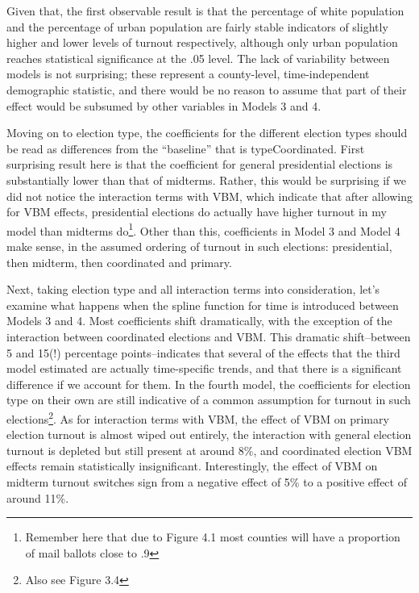 \documentclass[12pt,twoside]{reedthesis}
\begin{document}
  Given that, the first observable result is that the percentage of white
  population and the percentage of urban population are fairly stable
  indicators of slightly higher and lower levels of turnout respectively,
  although only urban population reaches statistical significance at the
  .05 level. The lack of variability between models is not surprising;
  these represent a county-level, time-independent demographic statistic,
  and there would be no reason to assume that part of their effect would
  be subsumed by other variables in Models 3 and 4.
  
  Moving on to election type, the coefficients for the different election
  types should be read as differences from the ``baseline'' that is
  typeCoordinated. First surprising result here is that the coefficient
  for general presidential elections is substantially lower than that of
  midterms. Rather, this would be surprising if we did not notice the
  interaction terms with VBM, which indicate that after allowing for VBM
  effects, presidential elections do actually have higher turnout in my
  model than midterms do\footnote{Remember here that due to Figure 4.1
    most counties will have a proportion of mail ballots close to .9}.
  Other than this, coefficients in Model 3 and Model 4 make sense, in the
  assumed ordering of turnout in such elections: presidential, then
  midterm, then coordinated and primary.
  
  Next, taking election type and all interaction terms into consideration,
  let's examine what happens when the spline function for time is
  introduced between Models 3 and 4. Most coefficients shift dramatically,
  with the exception of the interaction between coordinated elections and
  VBM. This dramatic shift--between 5 and 15(!) percentage
  points--indicates that several of the effects that the third model
  estimated are actually time-specific trends, and that there is a
  significant difference if we account for them. In the fourth model, the
  coefficients for election type on their own are still indicative of a
  common assumption for turnout in such elections\footnote{Also see Figure
    3.4}. As for interaction terms with VBM, the effect of VBM on primary
  election turnout is almost wiped out entirely, the interaction with
  general election turnout is depleted but still present at around 8\%,
  and coordinated election VBM effects remain statistically insignificant.
  Interestingly, the effect of VBM on midterm turnout switches sign from a
  negative effect of 5\% to a positive effect of around 11\%.
  
\end{document}
